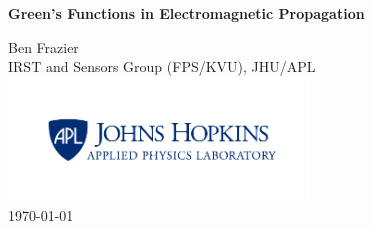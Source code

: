 \documentclass[12pt]{report}  %
\numberwithin{equation}{chapter}
\renewcommand{\baselinestretch}{2}
\begin{document}
\titlepage
\begin{center}
\vspace*{25pt}
{\huge \bfseries Green's Functions in Electromagnetic Propagation\\}

\vspace{150 pt}

\large Ben Frazier \\
 \small IRST and Sensors Group (FPS/KVU), JHU/APL \\
\includegraphics[width=0.6\textwidth]{../media/apl_small_horizontal_blue} \\
\vspace{125pt}
\large \today
\end{center}

\newpage
\pagestyle{plain}
\setcounter{page}{2}

\renewcommand{\baselinestretch}{1}
\small\normalsize
\tableofcontents %
\newpage
\listoffigures %
\newpage
\listoftables %
\newpage


\setlength{\parskip}{0em}
\renewcommand{\baselinestretch}{2}
\small\normalsize


\setcounter{page}{1}



\newpage
\appendix
\renewcommand{\thechapter}{A}
\renewcommand{\chaptername}{Appendix}


\newpage
 

\end{document}
